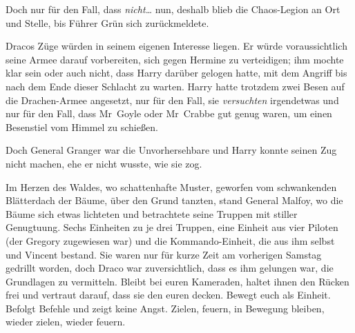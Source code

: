 Doch nur für den Fall, dass \emph{nicht…} nun, deshalb blieb die Chaos-Legion an Ort und Stelle, bis Führer Grün sich zurückmeldete.

Dracos Züge würden in seinem eigenen Interesse liegen. Er würde voraussichtlich seine Armee darauf vorbereiten, sich gegen Hermine zu verteidigen; ihm mochte klar sein oder auch nicht, dass Harry darüber gelogen hatte, mit dem Angriff bis nach dem Ende dieser Schlacht zu warten. Harry hatte trotzdem zwei Besen auf die Drachen-Armee angesetzt, nur für den Fall, sie \emph{versuchten} irgendetwas und nur für den Fall, dass Mr~Goyle oder Mr~Crabbe gut genug waren, um einen Besenstiel vom Himmel zu schießen.

Doch General Granger war die Unvorhersehbare und Harry konnte seinen Zug nicht machen, ehe er nicht wusste, wie sie zog.

\later

Im Herzen des Waldes, wo schattenhafte Muster, geworfen vom schwankenden Blätterdach der Bäume, über den Grund tanzten, stand General Malfoy, wo die Bäume sich etwas lichteten und betrachtete seine Truppen mit stiller Genugtuung. Sechs Einheiten zu je drei Truppen, eine Einheit aus vier Piloten (der Gregory zugewiesen war) und die Kommando-Einheit, die aus ihm selbst und Vincent bestand. Sie waren nur für kurze Zeit am vorherigen Samstag gedrillt worden, doch Draco war zuversichtlich, dass es ihm gelungen war, die Grundlagen zu vermitteln. Bleibt bei euren Kameraden, haltet ihnen den Rücken frei und vertraut darauf, dass sie den euren decken. Bewegt euch als Einheit. Befolgt Befehle und zeigt keine Angst. Zielen, feuern, in Bewegung bleiben, wieder zielen, wieder feuern.

